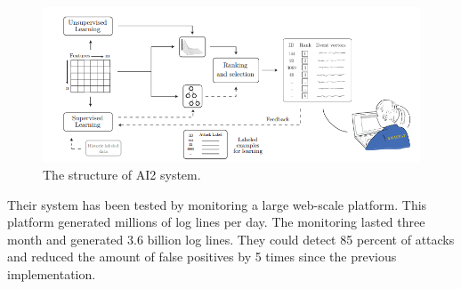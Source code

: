 \begin{figure}[H]
\centering
\includegraphics[width=1\textwidth]{Figures/AI2}
\decoRule
\caption[The structure of AI2 system]{The structure of AI2 system. \cite{mit2}}
\label{fig:mit}
\end{figure}

\noindent Their system has been tested by monitoring a large web-scale platform. This platform generated millions of log lines per day. The monitoring lasted three month and generated 3.6 billion log lines. They could detect 85 percent of attacks and reduced the amount of false positives by 5 times since the previous implementation. \cite{mit2}

